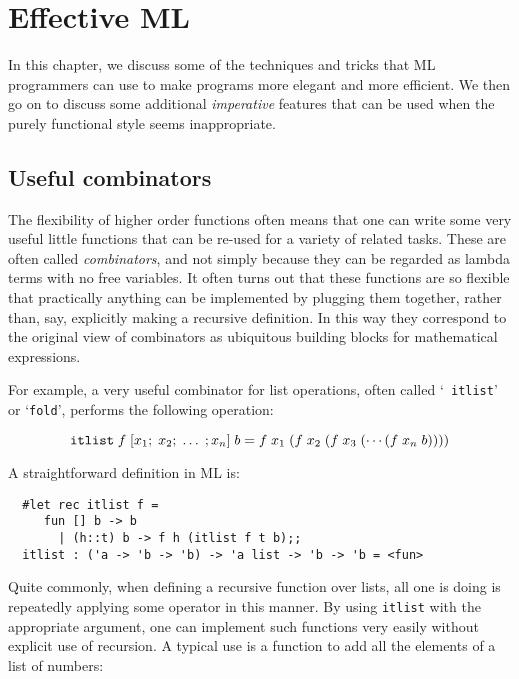 \chapter{Effective ML}

In this chapter, we discuss some of the techniques and tricks that ML
programmers can use to make programs more elegant and more efficient. We then
go on to discuss some additional {\em imperative} features that can be used
when the purely functional style seems inappropriate.

\section{Useful combinators}

The flexibility of higher order functions often means that one can write some
very useful little functions that can be re-used for a variety of related
tasks. These are often called {\em combinators}, and not simply because they
can be regarded as lambda terms with no free variables. It often turns out that
these functions are so flexible that practically anything can be implemented by
plugging them together, rather than, say, explicitly making a recursive
definition. In this way they correspond to the original view of combinators as
ubiquitous building blocks for mathematical expressions.

For example, a very useful combinator for list operations, often called `{\tt
itlist}' or `{\tt fold}', performs the following operation:

$$ \mbox{\tt itlist}\; f\; [x_1;\; x_2;\; \ldots \;; x_n]\; b =
f\; x_1\; (f\; x_2\; (f\; x_3\; ( \cdots (f\; x_n\; b)))) $$

\noindent A straightforward definition in ML is:

\begin{boxed}\begin{verbatim}
  #let rec itlist f =
     fun [] b -> b
       | (h::t) b -> f h (itlist f t b);;
  itlist : ('a -> 'b -> 'b) -> 'a list -> 'b -> 'b = <fun>
\end{verbatim}\end{boxed}

Quite commonly, when defining a recursive function over lists, all one is doing
is repeatedly applying some operator in this manner. By using {\tt itlist} with
the appropriate argument, one can implement such functions very easily without
explicit use of recursion. A typical use is a function to add all the elements
of a list of numbers:

